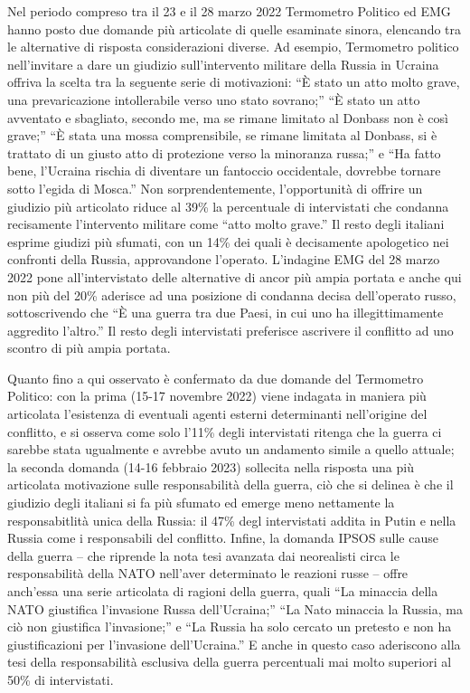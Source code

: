 \documentclass[
]{book}
\begin{document}
Nel periodo compreso tra il 23 e il 28 marzo 2022 Termometro Politico ed EMG hanno posto due domande più articolate di quelle esaminate sinora, elencando tra le alternative di risposta considerazioni diverse. Ad esempio, Termometro politico nell'invitare a dare un giudizio sull'intervento militare della Russia in Ucraina offriva la scelta tra la seguente serie di motivazioni: ``È stato un atto molto grave, una prevaricazione intollerabile verso uno stato sovrano;'' ``È stato un atto avventato e sbagliato, secondo me, ma se rimane limitato al Donbass non è così grave;'' ``È stata una mossa comprensibile, se rimane limitata al Donbass, si è trattato di un giusto atto di protezione verso la minoranza russa;'' e ``Ha fatto bene, l'Ucraina rischia di diventare un fantoccio occidentale, dovrebbe tornare sotto l'egida di Mosca.'' Non sorprendentemente, l'opportunità di offrire un giudizio più articolato riduce al 39\% la percentuale di intervistati che condanna recisamente l'intervento militare come ``atto molto grave.'' Il resto degli italiani esprime giudizi più sfumati, con un 14\% dei quali è decisamente apologetico nei confronti della Russia, approvandone l'operato. L'indagine EMG del 28 marzo 2022 pone all'intervistato delle alternative di ancor più ampia portata e anche qui non più del 20\% aderisce ad una posizione di condanna decisa dell'operato russo, sottoscrivendo che ``È una guerra tra due Paesi, in cui uno ha illegittimamente aggredito l'altro.'' Il resto degli intervistati preferisce ascrivere il conflitto ad uno scontro di più ampia portata.

Quanto fino a qui osservato è confermato da due domande del Termometro Politico: con la prima (15-17 novembre 2022) viene indagata in maniera più articolata l'esistenza di eventuali agenti esterni determinanti nell'origine del conflitto, e si osserva come solo l'11\% degli intervistati ritenga che la guerra ci sarebbe stata ugualmente e avrebbe avuto un andamento simile a quello attuale; la seconda domanda (14-16 febbraio 2023) sollecita nella risposta una più articolata motivazione sulle responsabilità della guerra, ciò che si delinea è che il giudizio degli italiani si fa più sfumato ed emerge meno nettamente la responsabitlità unica della Russia: il 47\% degl intervistati addita in Putin e nella Russia come i responsabili del conflitto. Infine, la domanda IPSOS sulle cause della guerra -- che riprende la nota tesi avanzata dai neorealisti circa le responsabilità della NATO nell'aver determinato le reazioni russe -- offre anch'essa una serie articolata di ragioni della guerra, quali ``La minaccia della NATO giustifica l'invasione Russa dell'Ucraina;'' ``La Nato minaccia la Russia, ma ciò non giustifica l'invasione;'' e ``La Russia ha solo cercato un pretesto e non ha giustificazioni per l'invasione dell'Ucraina.'' E anche in questo caso aderiscono alla tesi della responsabilità esclusiva della guerra percentuali mai molto superiori al 50\% di intervistati.
\end{document}
